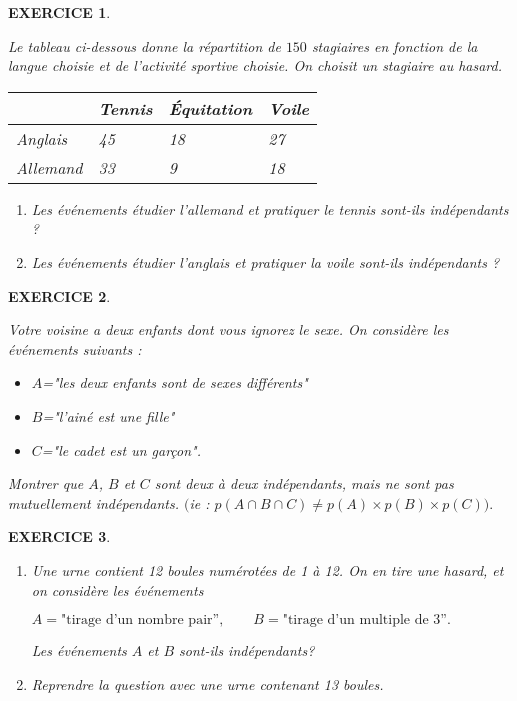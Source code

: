 \documentclass[a4paper]{article}   %
\renewcommand{\(}{\left(}
\renewcommand{\)}{\right)}
\newtheorem{EXO}{\large EXERCICE }
\newenvironment{EX}   { \setcounter{ques}{0} \begin{EXO} \hrulefill ~\vspace{0.3cm}

\normalfont}    {\end{EXO} \medskip}
\newcommand{\x}{\times} %
\begin{document}
\begin{EX}

Le tableau ci-dessous donne la répartition de $150$ stagiaires en fonction de la langue choisie et de l'activité sportive choisie. On choisit un stagiaire au hasard. 

\begin{center}
\begin{tabular}{|p{3cm}| p{3cm}| p{3cm}| p{3cm}|}		
\hline							
 & Tennis & \'Equitation & Voile\\
\hline
Anglais &45 & 18  &27\\
\hline
Allemand &33 & 9 &18 \\
\hline
\end{tabular}
\end{center}
\begin{enumerate}
\item  Les événements \og étudier l'allemand \fg{} et \og pratiquer le tennis \fg{} sont-ils indépendants ?
\item  Les événements \og étudier l'anglais \fg{} et \og pratiquer la voile \fg{} sont-ils indépendants ?
\end{enumerate}

\end{EX}
\begin{EX}

Votre voisine a deux enfants dont vous ignorez le sexe. On considère les événements suivants :
\begin{itemize}
\item $A$="les deux enfants sont de sexes différents"
\item $B$="l'ainé est une fille"
\item $C$="le cadet est un garçon".
\end{itemize}
Montrer que $A$, $B$ et $C$ sont deux à deux indépendants, mais ne sont pas mutuellement indépendants. $ \big( $ie : $p(A \cap B \cap C) \ne p(A) \x p(B) \x p(C) \big).$


\end{EX}
\begin{EX}

\begin{enumerate}
\item Une urne contient 12 boules numérotées de 1 à 12. On en tire une hasard, et on considère les événements 
\begin{center}
$A=\textrm{"tirage d'un nombre pair''}, \qquad B=\textrm{"tirage d'un multiple de 3''}.$
\end{center}
Les événements $A$ et $B$ sont-ils indépendants?
\item Reprendre la question avec une urne contenant 13 boules.
\end{enumerate}

\end{EX}
\end{document}
